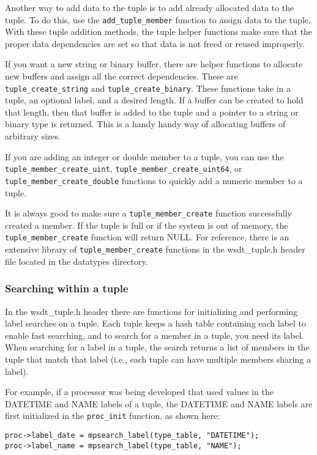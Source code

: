 \documentclass[11pt]{article}
\begin{document}
Another way to add data to the tuple is to add already allocated data to the 
tuple. To do this, use the \texttt{add\_tuple\_member} function to assign data 
to the tuple. With these tuple addition methods, the tuple helper functions 
make sure that  the proper data dependencies are set so that data is not freed 
or reused  improperly.

If you want a new string or binary buffer, there are helper functions 
to allocate new buffers and assign all the correct dependencies. These are 
\texttt{tuple\_create\_string} and \texttt{tuple\_create\_binary}. These 
functions take in a tuple, an optional label, and a desired length.  If a 
buffer can be created to hold that length, then that buffer is added to the 
tuple and a pointer to a string or binary type is returned. This is a handy 
handy way of allocating buffers of arbitrary sizes.

If you are adding an integer or double member to a tuple, you can use the 
\texttt{tuple\_member\_create\_uint}, \texttt{tuple\_member\_create\_uint64}, 
or \texttt{tuple\_member\_create\_double} functions to quickly add a numeric
member to a tuple. 

It is always good to make sure a \texttt{tuple\_member\_create} function 
successfully created a member. If the tuple is full or if the system is out of 
memory, the \texttt{tuple\_member\_create} function will return NULL. For 
reference, there is an extensive library of \texttt{tuple\_member\_create} 
functions in the wsdt\_tuple.h header file located in the datatypes directory.

\subsubsection{Searching within a tuple}
In the wsdt\_tuple.h header there are functions for initializing and performing
label searches on a tuple. Each tuple keeps a hash table containing each 
label to enable fast searching, and to search for a member in a tuple, you 
need its label.  When searching for a label in a tuple, the search returns a 
list of members in the tuple that match that label (i.e., each tuple can have 
multiple members sharing a label).
 
For example, if a processor was being developed that used values in the 
DATETIME and NAME labels of a tuple, the DATETIME and NAME labels are first 
initialized in the \texttt{proc\_init} function, as shown here:

\begin{lstlisting}
proc->label_date = mpsearch_label(type_table, "DATETIME");
proc->label_name = mpsearch_label(type_table, "NAME");
\end{lstlisting}
\end{document}
